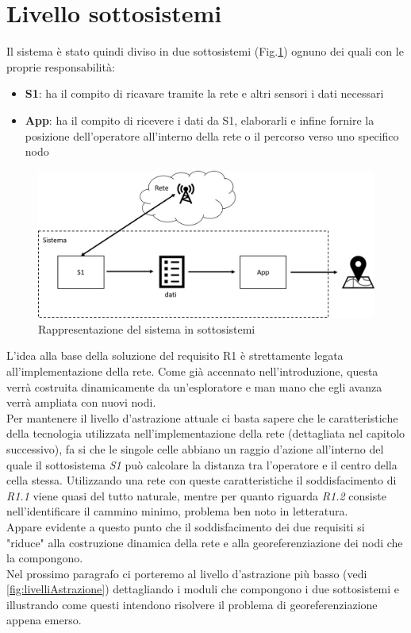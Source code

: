 \section{Livello sottosistemi}
Il sistema è stato quindi diviso in due sottosistemi (Fig.\ref{fig:sistema_liv1}) ognuno dei quali con le proprie responsabilità:
\begin{itemize}
	\item \textbf{S1}: ha il compito di ricavare tramite la rete e altri sensori i dati necessari
	\item \textbf{App}: ha il compito di ricevere i dati da S1, elaborarli e infine fornire la posizione dell'operatore all'interno della rete o il percorso verso uno specifico nodo
\end{itemize}

\begin{figure}[H]
	\centering
	\includegraphics[scale=0.3]{DescrizioneDelSistema/sistema_liv1.png}
	\caption{Rappresentazione del sistema in sottosistemi }
	\label{fig:sistema_liv1}
\end{figure}
L'idea alla base della soluzione del requisito R1 è strettamente legata all'implementazione della rete. Come già accennato nell'introduzione, questa verrà costruita dinamicamente da un'esploratore e man mano che egli avanza verrà ampliata con nuovi nodi. \\
Per mantenere il livello d'astrazione attuale ci basta sapere che le caratteristiche della tecnologia utilizzata nell'implementazione della rete (dettagliata nel capitolo successivo), fa si che le singole celle abbiano un raggio d'azione all'interno del quale il sottosistema \textit{S1} può calcolare la distanza tra l'operatore e il centro della cella stessa. Utilizzando una rete con queste caratteristiche il soddisfacimento di \textit{R1.1} viene quasi del tutto naturale, mentre per quanto riguarda \textit{R1.2} consiste nell'identificare il cammino minimo, problema ben noto in letteratura.\\
Appare evidente a questo punto che il soddisfacimento dei due requisiti si "riduce" alla costruzione dinamica della rete e alla georeferenziazione dei nodi che la compongono.\\
Nel prossimo paragrafo ci porteremo al livello d'astrazione più basso (vedi \ref{fig:livelliAstrazione}) dettagliando i moduli che compongono i due sottosistemi e illustrando come questi intendono risolvere il problema di georeferenziazione appena emerso.


